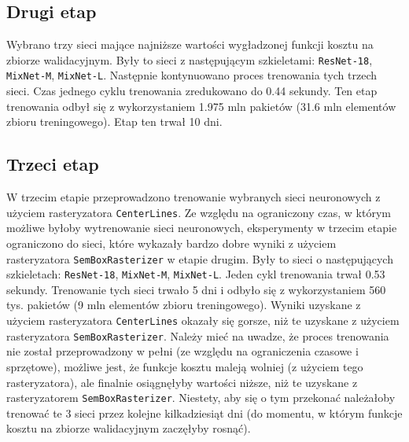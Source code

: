 \subsection{Drugi etap}

Wybrano trzy sieci mające najniższe wartości wygładzonej funkcji kosztu na zbiorze walidacyjnym. Były to sieci z następującym szkieletami: \texttt{ResNet-18}, \texttt{MixNet-M}, \texttt{MixNet-L}. Następnie kontynuowano proces trenowania tych trzech sieci. Czas jednego cyklu trenowania zredukowano do 0.44 sekundy. Ten etap trenowania odbył się z wykorzystaniem 1.975 mln pakietów (31.6 mln elementów zbioru treningowego). Etap ten trwał 10 dni.

\subsection{Trzeci etap}

W trzecim etapie przeprowadzono trenowanie wybranych sieci neuronowych z użyciem rasteryzatora \texttt{CenterLines}. Ze względu na ograniczony czas, w którym możliwe byłoby wytrenowanie sieci neuronowych, eksperymenty w trzecim etapie ograniczono do sieci, które wykazały bardzo dobre wyniki z użyciem rasteryzatora \texttt{SemBoxRasterizer} w etapie drugim. Były to sieci o następujących szkieletach: \texttt{ResNet-18}, \texttt{MixNet-M}, \texttt{MixNet-L}. Jeden cykl trenowania trwał 0.53 sekundy. Trenowanie tych sieci trwało 5 dni i odbyło się z wykorzystaniem 560 tys. pakietów (9 mln elementów zbioru treningowego). Wyniki uzyskane z użyciem rasteryzatora \texttt{CenterLines} okazały się gorsze, niż te uzyskane z użyciem rasteryzatora \texttt{SemBoxRasterizer}. Należy mieć na uwadze, że proces trenowania nie został przeprowadzony w pełni (ze względu na ograniczenia czasowe i sprzętowe), możliwe jest, że funkcje kosztu maleją wolniej (z użyciem tego rasteryzatora), ale finalnie osiągnęłyby wartości niższe, niż te uzyskane z rasteryzatorem \texttt{SemBoxRasterizer}. Niestety, aby się o tym przekonać należałoby trenować te 3 sieci przez kolejne kilkadziesiąt dni (do momentu, w którym funkcje kosztu na zbiorze walidacyjnym zaczęłyby rosnąć).